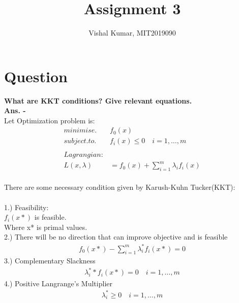 \documentclass[fleqn]{article}
\title{Assignment 3}
\author{Vishal Kumar, MIT2019090}
\date{}
\newcommand\tab[1][1cm]{\hspace*{#1}}
\begin{document}
\maketitle

\section*{Question}
{\bf What are KKT conditions? Give relevant equations.}
\\
{\bf Ans. -} 
\\
Let Optimization problem is:
\begin{align*}
minimise. \quad& f_0(x)\\
subject.to. \quad& f_i(x) \le 0 \quad i=1,\ldots,m\\
\\
Lagrangian:\\
L(x,\lambda) &= f_0(x) + \sum_{i=1}^m \lambda_i f_i(x)
\end{align*}
\\
There are some necessary condition given by Karush-Kuhn Tucker(KKT):
\\
\\
1.) Feasibility:
\\ 
\tab $f_i(x*)$ is feasible.
\\
\tab Where x* is primal values.
\\
2.) There will be no direction that can improve objective and is feasible
\begin{align*}
f_0(x*) - \sum_{i=1}^m \lambda_i^* f_i(x*) = 0
\end{align*}
3.) Complementary Slackness
\begin{align*}
\lambda_i^* * f_i(x*) = 0 \quad i=1,\ldots,m
\end{align*}
4.) Positive Langrange's Multiplier
\begin{align*}
\lambda_i^* \geq 0 \quad i=1,\ldots,m
\end{align*}
\end{document}
